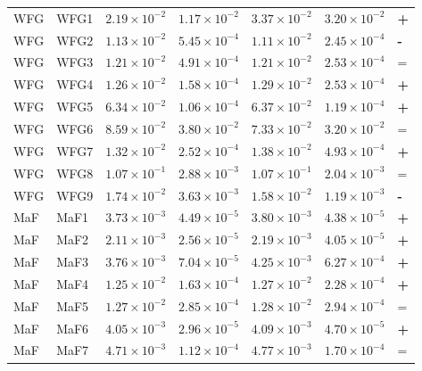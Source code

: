 \begin{table}[t]
\begin{tabular}{llrrrrl}
\addlinespace
WFG & WFG1 & $2.19\!\times\!10^{-2}$ & $1.17\!\times\!10^{-2}$ & $3.37\!\times\!10^{-2}$ & $3.20\!\times\!10^{-2}$ & \textbf{+} \\
WFG & WFG2 & $1.13\!\times\!10^{-2}$ & $5.45\!\times\!10^{-4}$ & $1.11\!\times\!10^{-2}$ & $2.45\!\times\!10^{-4}$ & \textbf{-} \\
WFG & WFG3 & $1.21\!\times\!10^{-2}$ & $4.91\!\times\!10^{-4}$ & $1.21\!\times\!10^{-2}$ & $2.53\!\times\!10^{-4}$ & = \\
WFG & WFG4 & $1.26\!\times\!10^{-2}$ & $1.58\!\times\!10^{-4}$ & $1.29\!\times\!10^{-2}$ & $2.53\!\times\!10^{-4}$ & \textbf{+} \\
WFG & WFG5 & $6.34\!\times\!10^{-2}$ & $1.06\!\times\!10^{-4}$ & $6.37\!\times\!10^{-2}$ & $1.19\!\times\!10^{-4}$ & \textbf{+} \\
WFG & WFG6 & $8.59\!\times\!10^{-2}$ & $3.80\!\times\!10^{-2}$ & $7.33\!\times\!10^{-2}$ & $3.20\!\times\!10^{-2}$ & = \\
WFG & WFG7 & $1.32\!\times\!10^{-2}$ & $2.52\!\times\!10^{-4}$ & $1.38\!\times\!10^{-2}$ & $4.93\!\times\!10^{-4}$ & \textbf{+} \\
WFG & WFG8 & $1.07\!\times\!10^{-1}$ & $2.88\!\times\!10^{-3}$ & $1.07\!\times\!10^{-1}$ & $2.04\!\times\!10^{-3}$ & = \\
WFG & WFG9 & $1.74\!\times\!10^{-2}$ & $3.63\!\times\!10^{-3}$ & $1.58\!\times\!10^{-2}$ & $1.19\!\times\!10^{-3}$ & \textbf{-} \\
\addlinespace
MaF & MaF1 & $3.73\!\times\!10^{-3}$ & $4.49\!\times\!10^{-5}$ & $3.80\!\times\!10^{-3}$ & $4.38\!\times\!10^{-5}$ & \textbf{+} \\
MaF & MaF2 & $2.11\!\times\!10^{-3}$ & $2.56\!\times\!10^{-5}$ & $2.19\!\times\!10^{-3}$ & $4.05\!\times\!10^{-5}$ & \textbf{+} \\
MaF & MaF3 & $3.76\!\times\!10^{-3}$ & $7.04\!\times\!10^{-5}$ & $4.25\!\times\!10^{-3}$ & $6.27\!\times\!10^{-4}$ & \textbf{+} \\
MaF & MaF4 & $1.25\!\times\!10^{-2}$ & $1.63\!\times\!10^{-4}$ & $1.27\!\times\!10^{-2}$ & $2.28\!\times\!10^{-4}$ & \textbf{+} \\
MaF & MaF5 & $1.27\!\times\!10^{-2}$ & $2.85\!\times\!10^{-4}$ & $1.28\!\times\!10^{-2}$ & $2.94\!\times\!10^{-4}$ & = \\
MaF & MaF6 & $4.05\!\times\!10^{-3}$ & $2.96\!\times\!10^{-5}$ & $4.09\!\times\!10^{-3}$ & $4.70\!\times\!10^{-5}$ & \textbf{+} \\
MaF & MaF7 & $4.71\!\times\!10^{-3}$ & $1.12\!\times\!10^{-4}$ & $4.77\!\times\!10^{-3}$ & $1.70\!\times\!10^{-4}$ & = \\
\bottomrule
\end{tabular}
\end{table}
